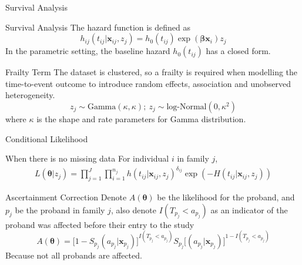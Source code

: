 \documentclass [aspectratio=169]{beamer}
\begin{document}
\begin{frame}{Survival Analysis}
    \begin{block}{Survival Analysis}
        The hazard function is defined as 
        \begin{equation} 
            h_{ij}(t_{ij}|\mathbf{x}_{ij}, z_j)=h_0(t_{ij})\exp(\boldsymbol{\beta}\mathbf{x}_i)z_j
        \end{equation}
        In the parametric setting, the baseline hazard $h_0(t_{ij})$ has a closed form. 
    \end{block}
    \begin{block}{Frailty Term}
        The dataset is clustered, so a frailty is required when modelling the time-to-event outcome to introduce random effects, association and unobserved heterogeneity.
        \begin{equation} 
            z_j\sim \text{Gamma}(\kappa, \kappa);~ z_j\sim\text{log-Normal}(0, \kappa^2)
        \end{equation}
        where $\kappa$ is the shape and rate parameters for Gamma distribution. 
    \end{block}
\end{frame}

\begin{frame}{Conditional Likelihood}
    \begin{block}{When there is no missing data}
        For individual $i$ in family $j$,
        \begin{align} 
            L(\boldsymbol{\theta}|z_j)=\prod_{j=1}^J\prod_{i=1}^{n_j} h(t_{ij}|\mathbf{x}_{ij}, z_j)^{\delta_{ij}}\exp (-H(t_{ij}|\mathbf{x}_{ij},z_j))
        \end{align}
    \end{block}
    \begin{block}{Ascertainment Correction}
        Denote $A(\boldsymbol{\theta})$ be the likelihood for the proband, and $p_j$ be the proband in family $j$, also denote $I(T_{p_j}<a_{p_j})$ as an indicator of the proband was affected before their entry to the study 
        \begin{equation} 
            A(\boldsymbol{\theta})=\Big [1-S_{p_j}(a_{p_j}|\mathbf{x}_{p_j})\Big ]^{I(T_{p_j}<a_{p_j})}S_{p_j}\Big [(a_{p_j}|\mathbf{x}_{p_j})\Big ]^{1-I(T_{p_j}<a_{p_j})}
        \end{equation} 
        Because not all probands are affected.
    \end{block}
\end{frame}
\end{document}
